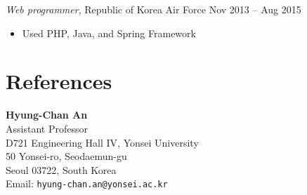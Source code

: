 \documentclass{article}
\newcommand{\killinitspace}{-0.7em}
\begin{document}
\textsl{Web programmer}, Republic of Korea Air Force \hfill Nov 2013 -- Aug 2015
\vspace{\killinitspace}
\begin{itemize}
\item Used PHP, Java, and Spring Framework
\end{itemize}


\section{References}
\parbox{0.5\textwidth}{
\textbf{Hyung-Chan An}\\
Assistant Professor \\
D721 Engineering Hall IV, Yonsei University \\
50 Yonsei-ro, Seodaemun-gu \\
Seoul 03722, South Korea\\
Email: \texttt{hyung-chan.an@yonsei.ac.kr}
}
\end{document}
